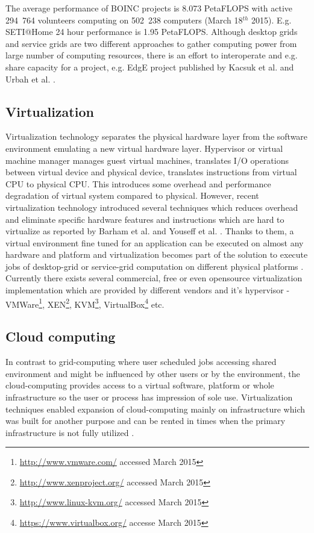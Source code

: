 The average performance of BOINC projects is 8.073 PetaFLOPS  with active 294~764 volunteers computing on 502~238 computers (March 18$^{th}$ 2015). E.g. SETI@Home 24 hour performance is 1.95 PetaFLOPS. Although desktop grids and service grids are two different approaches to gather computing power from large number of computing resources, there is an effort to interoperate and e.g. share capacity for a project, e.g. EdgE project published by Kacsuk et al.\cite{Kacsuk2008}  and Urbah et al. \cite{Urbah2009}.

\subsection{Virtualization}
\label{sec:introvirtual}
Virtualization technology separates the physical hardware layer from the software environment emulating a new virtual hardware layer. Hypervisor or virtual machine manager manages guest virtual machines, translates I/O operations between virtual device and physical device, translates instructions from virtual CPU to physical CPU. This introduces some overhead and performance degradation of virtual system compared to physical. However, recent virtualization technology introduced several techniques which reduces overhead and eliminate specific hardware features and instructions which are hard to virtualize as reported by Barham et al. and Youseff et al. \cite{Barham2003,Youseff2006}.
Thanks to them, a virtual environment fine tuned for an application can be executed on almost any hardware and platform and virtualization becomes part of the solution to execute jobs of desktop-grid or service-grid computation on different physical platforms \cite{ruda2009virtual}.
Currently there exists several commercial, free or even opensource virtualization implementation which are provided by different vendors and it's hypervisor - VMWare\footnote{\url{http://www.vmware.com/} accessed March 2015}, XEN\footnote{\url{http://www.xenproject.org/} accessed March 2015}, KVM\footnote{\url{http://www.linux-kvm.org/} accessed March 2015}, VirtualBox\footnote{\url{https://www.virtualbox.org/} accesse March 2015} etc. 


\subsection{Cloud computing}

In contrast to grid-computing where user scheduled jobs accessing shared environment and might be influenced by other users or by the environment, the cloud-computing provides access to a virtual software, platform or whole infrastructure so the user or process has impression of sole use. Virtualization techniques enabled expansion of cloud-computing mainly on infrastructure which was built for another purpose and can be rented in times when the primary infrastructure is not fully utilized \cite{Foster2008}. 

